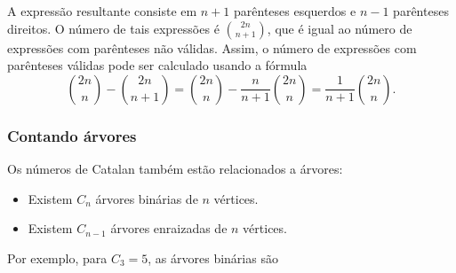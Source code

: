 A expressão resultante consiste em $n+1$
parênteses esquerdos e $n-1$ parênteses direitos.
O número de tais expressões é ${2n \choose n+1}$,
que é igual ao número de expressões
com parênteses não válidas.
Assim, o número de expressões
com parênteses válidas pode ser calculado usando a fórmula
\[{2n \choose n}-{2n \choose n+1} = {2n \choose n} - \frac{n}{n+1} {2n \choose n} = \frac{1}{n+1} {2n \choose n}.\]

\subsubsection{Contando árvores}

Os números de Catalan também estão relacionados a árvores:

\begin{itemize}
\item Existem $C_n$ árvores binárias de $n$ vértices.
\item Existem $C_{n-1}$ árvores enraizadas de $n$ vértices.
\end{itemize}
\noindent
Por exemplo, para $C_3=5$, as árvores binárias são

